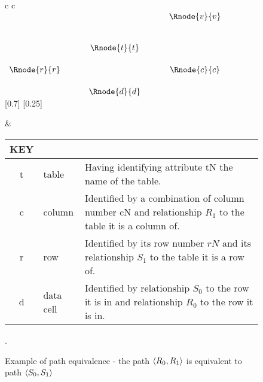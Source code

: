 \begin{figure} [h] %
\begin{center}
\begin{tabular}{c c}
$
\begin{array}{cp{0.5cm}cp{0.5cm}cp{0.3cm}c}
            &&              && \Rnode{v}{v} &&              \\[0.9cm]
            && \Rnode{t}{t} &&              &&              \\[0.5cm] 
\Rnode{r}{r}&&              && \Rnode{c}{c} &&              \\[0.5cm]     
	          && \Rnode{d}{d} &&              &&               
\end{array}
$
[0.7]
\idcomp
{} 
\idcomp
{} 
\idcomp
{}
\idcomp
{}
\idcomp
{}
\idcomp
[0.25]
\idcomp

& \footnotesize
\begin{tabular}{c p{1.5cm} p{3cm}}
KEY && \\
\hline
t & table & Having identifying attribute tN the name of the table. \\
c & column & Identified by a combination of column number cN and relationship $R_1$ to the table it is a column of.\\
r & row & Identified by its row number $rN$ and its relationship $S_1$ to the table it is a row of.\\
d & data cell & Identified by relationship $S_0$ to the row it is in and relationship $R_0$ to the row it is in. \\
\end{tabular} 
\end{tabular}
\end{center}
\caption{Example of path equivalence - the path $\langle R_0,R_1\rangle$ is equivalent to path $\langle S_0,S_1\rangle$}.
\label{datatablegraph}
\end{figure}